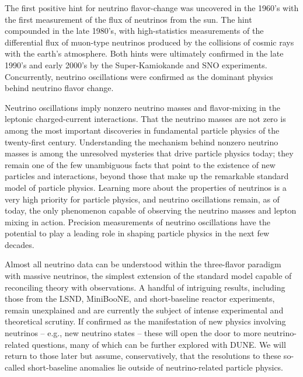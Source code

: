 
The first positive hint for neutrino flavor-change was uncovered in the 1960's with the first measurement of the flux of neutrinos from the sun. The hint compounded in the late 1980's, with high-statistics measurements of the differential flux of muon-type neutrinos produced by the collisions of cosmic rays with the earth's atmosphere. Both hints were ultimately confirmed in the late 1990's and early 2000's by the Super-Kamiokande and SNO experiments. Concurrently, neutrino oscillations were confirmed as the dominant physics behind neutrino flavor change. 

Neutrino oscillations imply nonzero neutrino masses and flavor-mixing in the leptonic charged-current interactions.  That the neutrino masses are not zero is among the most important discoveries in fundamental particle physics of the twenty-first century. Understanding the mechanism behind nonzero neutrino masses is among the unresolved mysteries that drive particle physics today; they remain one of the few unambiguous facts that point to the existence of new particles and interactions, beyond those that make up the remarkable standard model of particle physics. Learning more about the properties of neutrinos is a very high priority for particle physics, and neutrino oscillations remain, as of today, the only phenomenon capable of observing the neutrino masses and lepton mixing in action. Precision measurements of neutrino oscillations have the potential to play a leading role in shaping particle physics in the next few decades. 

Almost all neutrino data can be understood within the three-flavor paradigm with massive neutrinos, the simplest extension of the standard model capable of reconciling theory with observations. A handful of intriguing results, including those from the LSND, MiniBooNE, and short-baseline reactor experiments, remain unexplained and are currently the subject of intense experimental and theoretical scrutiny. If confirmed as the manifestation of new physics involving neutrinos -- e.g., new neutrino states --  these will open the door to more neutrino-related questions, many of which can be further explored with DUNE. We will return to those later but assume, conservatively, that the resolutions to these so-called short-baseline anomalies lie outside of neutrino-related particle physics. 

